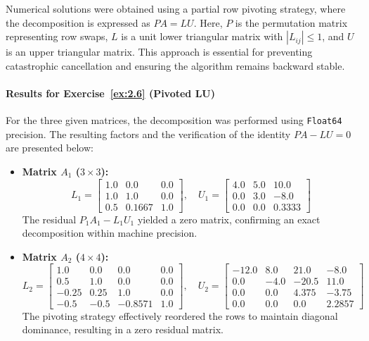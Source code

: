 \begin{solution}
    Numerical solutions were obtained using a partial row pivoting strategy, where the decomposition is expressed as $PA = LU$. Here, $P$ is the permutation matrix representing row swaps, $L$ is a unit lower triangular matrix with $|L_{ij}| \le 1$, and $U$ is an upper triangular matrix. This approach is essential for preventing catastrophic cancellation and ensuring the algorithm remains backward stable.

    \paragraph{Results for Exercise~\ref{ex:2.6} (Pivoted LU)}
    For the three given matrices, the decomposition was performed using \texttt{Float64} precision. The resulting factors and the verification of the identity $PA - LU = 0$ are presented below:

    \begin{itemize}
        \item \textbf{Matrix $A_1$ ($3\times3$):}
        \[
        L_1 = \begin{bmatrix} 1.0 & 0.0 & 0.0 \\ 1.0 & 1.0 & 0.0 \\ 0.5 & 0.1667 & 1.0 \end{bmatrix}, \quad
        U_1 = \begin{bmatrix} 4.0 & 5.0 & 10.0 \\ 0.0 & 3.0 & -8.0 \\ 0.0 & 0.0 & 0.3333 \end{bmatrix}
        \]
        The residual $P_1 A_1 - L_1 U_1$ yielded a zero matrix, confirming an exact decomposition within machine precision.

        \item \textbf{Matrix $A_2$ ($4\times4$):}
        \[
        L_2 = \begin{bmatrix} 1.0 & 0.0 & 0.0 & 0.0 \\ 0.5 & 1.0 & 0.0 & 0.0 \\ -0.25 & 0.25 & 1.0 & 0.0 \\ -0.5 & -0.5 & -0.8571 & 1.0 \end{bmatrix}, \quad
        U_2 = \begin{bmatrix} -12.0 & 8.0 & 21.0 & -8.0 \\ 0.0 & -4.0 & -20.5 & 11.0 \\ 0.0 & 0.0 & 4.375 & -3.75 \\ 0.0 & 0.0 & 0.0 & 2.2857 \end{bmatrix}
        \]
        The pivoting strategy effectively reordered the rows to maintain diagonal dominance, resulting in a zero residual matrix.


\end{itemize}
\end{solution}
